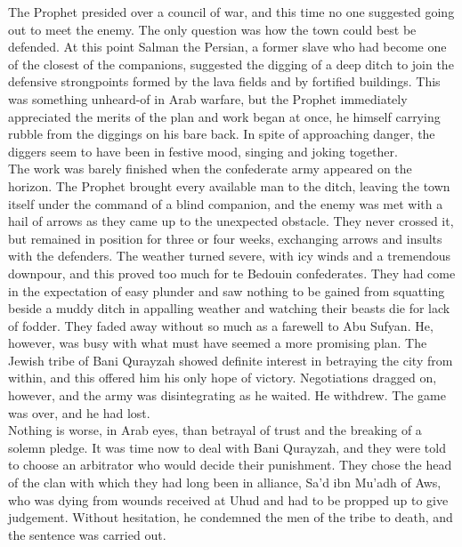 \documentclass[11pt, b5paper, twoside]{book}
\begin{document}
The Prophet presided over a council of war, and this time no one suggested going out to meet the 
enemy. The only question was how the town could best be defended. At this point Salman the Persian, a 
former slave who had become one of the closest of the companions, suggested the digging of a deep 
ditch to join the defensive strongpoints formed by the lava fields and by fortified buildings. This 
was something unheard-of in Arab warfare, but the Prophet immediately appreciated the merits of the 
plan and work began at once, he himself carrying rubble from the diggings on his bare back. In spite 
of approaching danger, the diggers seem to have been in festive mood, singing and joking together. \\

The work was barely finished when the confederate army appeared on the horizon. The Prophet brought 
every available man to the ditch, leaving the town itself under the command of a blind companion, and 
the enemy was met with a hail of arrows as they came up to the unexpected obstacle. They never 
crossed it, but remained in position for three or four weeks, exchanging arrows and insults with the 
defenders. The weather turned severe, with icy winds and a tremendous downpour, and this proved too 
much for te Bedouin confederates. They had come in the expectation of easy plunder and saw nothing to 
be gained from squatting beside a muddy ditch in appalling weather and watching their beasts die for 
lack of fodder. They faded away without so much as a farewell to Abu Sufyan. He, however, was busy 
with what must have seemed a more promising plan. The Jewish tribe of Bani Qurayzah showed definite 
interest in betraying the city from within, and this offered him his only hope of victory. 
Negotiations dragged on, however, and the army was disintegrating as he waited. He withdrew. The game 
was over, and he had lost. \\

Nothing is worse, in Arab eyes, than betrayal of trust and the breaking of a solemn pledge. It was 
time now to deal with Bani Qurayzah, and they were told to choose an arbitrator who would decide 
their punishment. They chose the head of the clan with which they had long been in alliance, Sa'd ibn 
Mu'adh of Aws, who was dying from wounds received at Uhud and had to be propped up to give judgement. 
Without hesitation, he condemned the men of the tribe to death, and the sentence was carried out. \\
\end{document}
